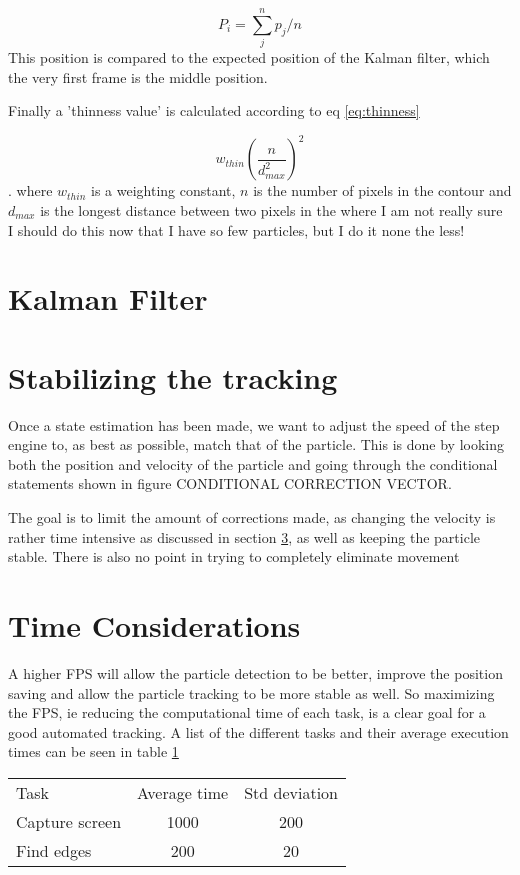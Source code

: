 \documentclass[]{report}
\begin{document}
\[
P_i = \sum_{j}^n p_j/n
\]
This position is compared to the expected position of the Kalman filter, which the very first frame is the middle position. 

Finally a 'thinness value' is calculated according to eq \ref{eq:thinness}

\begin{equation}\label{eq:thinness}
w_{thin}\left(\frac{ n}{d_{max}^2}\right)^2
\end{equation}. 
where $w_{thin}$ is a weighting constant, $n$ is the number of pixels in the contour and $d_{max}$ is the longest distance between two pixels in the 
where I am not really sure I should do this now that I have so few particles, but I do it none the less!

\section{Kalman Filter}


\section{Stabilizing the tracking}
Once a state estimation has been made, we want to adjust the speed of the step engine to, as best as possible, match that of the particle. This is done by looking both the position and velocity of the particle and going through the conditional statements shown in figure CONDITIONAL CORRECTION VECTOR. 

The goal is to limit the amount of corrections made, as changing the velocity is rather time intensive as discussed in section \ref{sec:time considerations}, as well as keeping the particle stable. There is also no point in trying to completely eliminate movement

\section{Time Considerations}\label{sec:time considerations}
A higher FPS will allow the particle detection to be better, improve the position saving and allow the particle tracking to be more stable as well. So maximizing the FPS, ie reducing the computational time of each task, is a clear goal for a good automated tracking. A list of the different tasks and their average execution times can be seen in table \ref{tab:benchmarks}

\begin{table}[H]
 \begin{tabular}{l | c | c } 
 Task  			&  Average time & Std deviation \\
 Capture screen & 1000 			& 200 \\
 Find edges 	& 200			& 20 \\
 \end{tabular}\label{tab:benchmarks}
\end{table}
\end{document}

